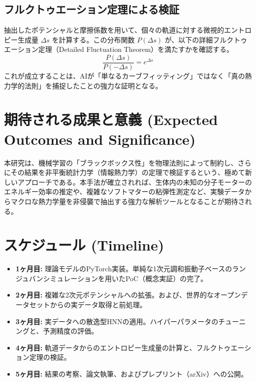 \documentclass[a4paper,12pt]{jlreq}
\begin{document}
\subsection{フルクトゥエーション定理による検証}
抽出したポテンシャルと摩擦係数を用いて、個々の軌道に対する微視的エントロピー生成量 $\Delta s$ を計算する。この分布関数 $P(\Delta s)$ が、以下の詳細フルクトゥエーション定理（Detailed Fluctuation Theorem）を満たすかを確認する。
\begin{equation}
    \frac{P(\Delta s)}{P(-\Delta s)} = e^{\Delta s}
\end{equation}
これが成立することは、AIが「単なるカーブフィッティング」ではなく「真の熱力学的法則」を捕捉したことの強力な証明となる。

\section{期待される成果と意義 (Expected Outcomes and Significance)}
本研究は、機械学習の「ブラックボックス性」を物理法則によって制約し、さらにその結果を非平衡統計力学（情報熱力学）の定理で検証するという、極めて新しいアプローチである。本手法が確立されれば、生体内の未知の分子モーターのエネルギー効率の推定や、複雑なソフトマターの粘弾性測定など、実験データからマクロな熱力学量を非侵襲で抽出する強力な解析ツールとなることが期待される。

\section{スケジュール (Timeline)}
\begin{itemize}
    \item \textbf{1ヶ月目:} 理論モデルのPyTorch実装。単純な1次元調和振動子ベースのランジュバンシミュレーションを用いたPoC（概念実証）の完了。
    \item \textbf{2ヶ月目:} 複雑な2次元ポテンシャルへの拡張。および、世界的なオープンデータセットからの実データ取得と前処理。
    \item \textbf{3ヶ月目:} 実データへの散逸型HNNの適用。ハイパーパラメータのチューニングと、予測精度の評価。
    \item \textbf{4ヶ月目:} 軌道データからのエントロピー生成量の計算と、フルクトゥエーション定理の検証。
    \item \textbf{5ヶ月目:} 結果の考察、論文執筆、およびプレプリント（arXiv）への公開。
\end{itemize}
\end{document}
